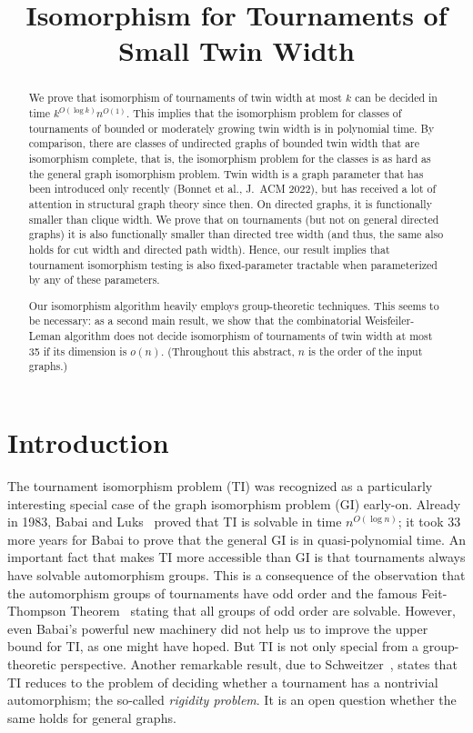 \documentclass{theoretics}
\title{Isomorphism for Tournaments of Small Twin Width}
\begin{document}
\maketitle

\begin{abstract}
 We prove that isomorphism of tournaments of twin width at most $k$ can be decided in time $k^{O(\log k)}n^{O(1)}$.
 This implies that the isomorphism problem for classes of tournaments of bounded or moderately growing twin width is in polynomial time.
 By comparison, there are classes of undirected graphs of bounded twin width that are isomorphism complete, that is, the isomorphism problem for the classes is as hard as the general graph isomorphism problem.
 Twin width is a graph parameter that has been introduced only recently (Bonnet et al., J.\ ACM 2022), but has received a lot of attention in structural graph theory since then.
 On directed graphs, it is functionally smaller than clique width.
 We prove that on tournaments (but not on general directed graphs) it is also functionally smaller than directed tree width (and thus, the same also holds for cut width and directed path width).
 Hence, our result implies that tournament isomorphism testing is also fixed-parameter tractable when parameterized by any of these parameters.

 Our isomorphism algorithm heavily employs group-theoretic techniques.
 This seems to be necessary: as a second main result, we show that the combinatorial Weisfeiler-Leman algorithm does not decide isomorphism of tournaments of twin width at most 35 if its dimension is $o(n)$.
 (Throughout this abstract, $n$ is the order of the input graphs.)
\end{abstract}



\section{Introduction}

The tournament isomorphism problem (TI) was recognized as a particularly interesting special case of the graph isomorphism problem (GI) early-on.
Already in 1983, Babai and Luks~\cite{BabaiL83} proved that TI is solvable in time $n^{O(\log n)}$;
it took 33 more years for Babai \cite{Babai16} to prove that the general GI is in quasi-polynomial time.
An important fact that makes TI more accessible than GI is that tournaments always have solvable automorphism groups.
This is a consequence of the observation that the automorphism groups of tournaments have odd order and the famous Feit-Thompson Theorem~\cite{FeitT63} stating that all groups of odd order are solvable.
However, even Babai's powerful new machinery did not help us to improve the upper bound for TI, as one might have hoped.
But TI is not only special from a group-theoretic perspective.
Another remarkable result, due to Schweitzer~\cite{Schweitzer17}, states that TI reduces to the problem of deciding whether a tournament has a nontrivial automorphism; the so-called \emph{rigidity problem}.
It is an open question whether the same holds for general graphs.
\end{document}
